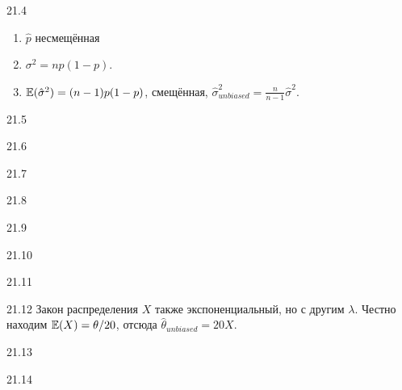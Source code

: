 \protect \hypertarget {soln:21.4}{}
\begin{solution}{{21.4}}
\begin{enumerate}
  \item $\hat p$ несмещённая
  \item $\sigma^2 = n p(1-p)$.
  \item $\mathbb{E}(\hat\sigma^2) = (n-1)p(1-p)$, смещённая, $\hat\sigma^2_{unbiased} = \frac{n}{n-1} \hat\sigma^2$.
\end{enumerate}
\end{solution}
\protect \hypertarget {soln:21.5}{}
\begin{solution}{{21.5}}

\end{solution}
\protect \hypertarget {soln:21.6}{}
\begin{solution}{{21.6}}

\end{solution}
\protect \hypertarget {soln:21.7}{}
\begin{solution}{{21.7}}

\end{solution}
\protect \hypertarget {soln:21.8}{}
\begin{solution}{{21.8}}

\end{solution}
\protect \hypertarget {soln:21.9}{}
\begin{solution}{{21.9}}

\end{solution}
\protect \hypertarget {soln:21.10}{}
\begin{solution}{{21.10}}

\end{solution}
\protect \hypertarget {soln:21.11}{}
\begin{solution}{{21.11}}

\end{solution}
\protect \hypertarget {soln:21.12}{}
\begin{solution}{{21.12}}
  Закон распределения $X$ также экспоненциальный, но с другим $\lambda$. Честно находим $\mathbb{E}(X)=\theta/20$, отсюда
  $\hat\theta_{unbiased} = 20X$.
\end{solution}
\protect \hypertarget {soln:21.13}{}
\begin{solution}{{21.13}}

\end{solution}
\protect \hypertarget {soln:21.14}{}
\begin{solution}{{21.14}}

\end{solution}
